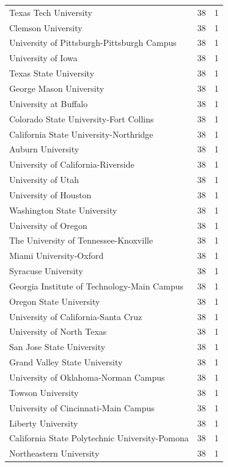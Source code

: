 \documentclass{mcmthesis}
\begin{document}
\begin{appendices}
    \newpage
    \begin{tabular}{lcc}\hline
        Texas Tech University	&38	&1\\
        Clemson University	&38&	1\\
        University of Pittsburgh-Pittsburgh Campus	&38	&1\\
        University of Iowa	&38	&1\\
        Texas State University	&38&	1\\
        George Mason University	&38&	1\\
        University at Buffalo	&38	&1\\
        Colorado State University-Fort Collins	&38	&1\\
        California State University-Northridge	&38	&1\\
        Auburn University	&38&1\\
        University of California-Riverside	&38&	1\\
        University of Utah	&38&	1\\
        University of Houston	&38	&1\\
        Washington State University	&38&	1\\
        University of Oregon	&38	&1\\
        The University of Tennessee-Knoxville	&38&	1\\
        Miami University-Oxford	&38	&1\\
        Syracuse University	&38	&1\\
        Georgia Institute of Technology-Main Campus	&38&	1\\
        Oregon State University	&38&	1\\
        University of California-Santa Cruz	&38&	1\\
        University of North Texas	&38	&1\\
        San Jose State University	&38	&1\\
        Grand Valley State University	&38&	1\\
        University of Oklahoma-Norman Campus	&38	&1\\
        Towson University	&38	&1\\
        University of Cincinnati-Main Campus&	38	&1\\
        Liberty University	&38&	1\\
        California State Polytechnic University-Pomona	&38&	1\\
        Northeastern University&	38	&1\\

\end{tabular}
\end{appendices}
\end{document}
